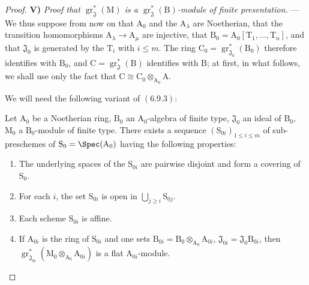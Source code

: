 \begin{proof}
\medskip
\noindent\textbf{V)} \emph{Proof that $\operatorname{gr}^*_\mathfrak{J}(\mathrm{M})$ is a $\operatorname{gr}^*_\mathfrak{J}(\mathrm{B})$-module of finite presentation.} --- We thus suppose from now on that $\mathrm{A}_0$ and the $\mathrm{A}_\lambda$ are Noetherian, that the transition homomorphisms $\mathrm{A}_\lambda\to\mathrm{A}_\mu$ are injective, that $\mathrm{B}_0=\mathrm{A}_0[\mathrm{T}_1,\ldots,\mathrm{T}_n]$, and that $\mathfrak{J}_0$ is generated by the $\mathrm{T}_i$ with $i\leqslant m$. The ring $\mathrm{C}_0=\operatorname{gr}^*_{\mathfrak{J}_0}(\mathrm{B}_0)$ therefore identifies with $\mathrm{B}_0$, and $\mathrm{C}=\operatorname{gr}^*_\mathfrak{J}(\mathrm{B})$ identifies with $\mathrm{B}$; at first, in what follows, we shall use only the fact that $\mathrm{C}\cong\mathrm{C}_0\otimes_{\mathrm{A}_0}\mathrm{A}$.

We will need the following variant of $(6.9.3)$:

\begin{lemma}[11.2.9.5]
\label{IV.11.2.9.5}
Let $\mathrm{A}_0$ be a Noetherian ring, $\mathrm{B}_0$ an $\mathrm{A}_0$-algebra of finite type, $\mathfrak{J}_0$ an ideal of $\mathrm{B}_0$, $\mathrm{M}_0$ a $\mathrm{B}_0$-module of finite type. There exists a sequence $(\mathrm{S}_{0i})_{1\leqslant i\leqslant m}$ of sub-preschemes of $\mathrm{S}_0=\Spec(\mathrm{A}_0)$ having the following properties:
\begin{enumerate}[label=\arabic{enumi}\textsuperscript{o}]
  \item The underlying spaces of the $\mathrm{S}_{0i}$ are pairwise disjoint and form a covering of $\mathrm{S}_0$.
  \item For each $i$, the set $\mathrm{S}_{0i}$ is open in $\bigcup_{j\geqslant i}\mathrm{S}_{0j}$.
  \item Each scheme $\mathrm{S}_{0i}$ is affine.
  \item If $\mathrm{A}_{0i}$ is the ring of $\mathrm{S}_{0i}$ and one sets $\mathrm{B}_{0i}=\mathrm{B}_0\otimes_{\mathrm{A}_0}\mathrm{A}_{0i}$, $\mathfrak{J}_{0i}=\mathfrak{J}_0\mathrm{B}_{0i}$, then $\operatorname{gr}^*_{\mathfrak{J}_{0i}}(\mathrm{M}_0\otimes_{\mathrm{A}_0}\mathrm{A}_{0i})$ is a flat $\mathrm{A}_{0i}$-module.
\end{enumerate}
\end{lemma}


\end{proof}
